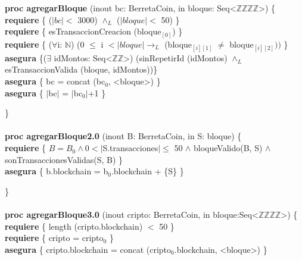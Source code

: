 \documentclass{article}
\newcommand{\Entero}{$\mathds{Z}$}
\newcommand{\Natural}{$\mathds{N}$}
\newcommand{\tuplaDeDosEnteros}{Seq\textless\Entero\texttimes\Entero\textgreater}
\newcommand{\tuplaDeCuatroEnteros}{Seq\textless\Entero\texttimes\Entero\texttimes\Entero\texttimes\Entero\textgreater}
\begin{document}
    \textbf{proc agregarBloque} (inout bc: \textdollar BerretaCoin, in bloque: \tuplaDeCuatroEnteros) \{\\
        \indent\indent \textbf{requiere} \{ ($|bc|<$ 3000) $\land_L$ ($|bloque|<$ 50) \}\\

        \indent\indent \textbf{requiere} \{ esTransaccionCreacion (bloque$_{[0]}$) \}\\

        \indent\indent \textbf{requiere} \{ ($\forall$i: \Natural)
                                (0 $\leq$ i $<|bloque| \rightarrow_L$ (bloque$_{[i][1]}$ $\neq$ bloque$_{[i][2]}))$ \}\\

        \indent\indent \textbf{asegura} \{($\exists$ idMontos: \tuplaDeDosEnteros) (sinRepetirId (idMontos)
                                            $\land_L$ esTransaccionValida (bloque, idMontos))\}\\

        \indent\indent \textbf{asegura} \{ bc = concat (bc$_0$, \textless bloque\textgreater) \}\\

        \indent\indent \textbf{asegura} \{ $|$bc$|$ = $|$bc$_0|$+1 \}

    \}\\\\

    \textbf{proc agregarBloque2.0} (inout B: BerretaCoin, in S: bloque) \{\\
        \indent\indent\textbf{requiere} \{ $B = B_0 \land 0 < |$S.transacciones$| \leq$ 50 $\land$ bloqueValido(B, S) $\land$ sonTransaccionesValidas(S, B) \}\\

        \indent\indent\textbf{asegura} \{ b.blockchain = b${_0}$.blockchain + \{S\} \}

    \}\\\\

    \textbf{proc agregarBloque3.0} (inout cripto: BerretaCoin, in bloque:\tuplaDeCuatroEnteros) \{\\
        \indent\indent\textbf{requiere} \{ length (cripto.blockchain) $<$ 50 \}\\

        \indent\indent\textbf{requiere} \{ cripto = cripto$_0$ \}\\

        \indent\indent\textbf{asegura} \{ cripto.blockchain = concat (cripto$_0$.blockchain, \textless bloque\textgreater) \}
    
\end{document}
